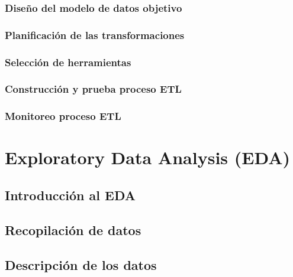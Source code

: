 \documentclass[letterpaper, 12pt]{report}
\begin{document}
\subsection{Diseño del modelo de datos objetivo}


\subsection{Planificación de las transformaciones}


\subsection{Selección de herramientas}


\subsection{Construcción y prueba proceso ETL}


\subsection{Monitoreo proceso ETL}


\chapter{\nohyphens{Exploratory Data Analysis (EDA)}}



\section{Introducción al EDA}


\section{Recopilación de datos}


\section{Descripción de los datos}

\end{document}
